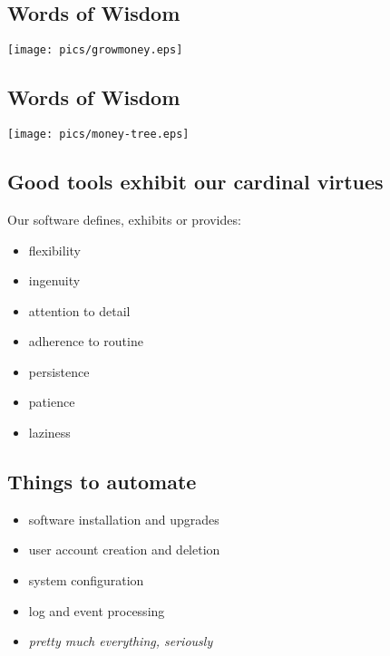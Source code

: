 \documentclass[xga]{xdvislides}
\begin{document}
\subsection{Words of Wisdom}
\vspace*{\fill}
\begin{center}
	\texttt{[image: pics/growmoney.eps]}
\end{center}
\vspace*{\fill}

\subsection{Words of Wisdom}
\vspace*{\fill}
\begin{center}
	\texttt{[image: pics/money-tree.eps]}
\end{center}
\vspace*{\fill}

\subsection{Good tools exhibit our cardinal virtues}
Our software defines, exhibits or provides:
\begin{itemize}
	\item flexibility
	\item ingenuity
	\item attention to detail
	\item adherence to routine
	\item persistence
	\item patience
	\item laziness
\end{itemize}

\subsection{Things to automate}
\begin{itemize}
	\item software installation and upgrades
	\item user account creation and deletion
	\item system configuration
	\item log and event processing
	\item {\em pretty much everything, seriously}
\end{itemize}
\end{document}
